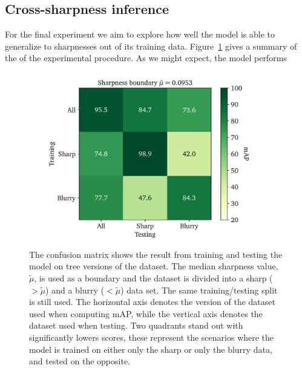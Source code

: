 \subsection{Cross-sharpness inference}
For the final experiment we aim to explore how well the model is able to generalize to sharpnesses out of its training data.
Figure~\ref{fig:results-sharpness-inference} gives a summary of the of the experimental procedure.
As we might expect, the model performs 

\begin{figure}[htbp]
  \centering
  \includegraphics[width=0.9\textwidth]{figs/results/sharpness/confustion_balanced_test_map.pdf}
  \caption[mAP across sharpness boundary]{%
The confusion matrix shows the result from training and testing the model on tree versions of the dataset. 
The median sharpness value, \(\tilde{\mu}\), is used as a boundary and the dataset is divided into a sharp (\(>\tilde{\mu}\)) and a blurry (\(<\tilde{\mu}\)) data set.
The same training/testing split is still used. 
The horizontal axis denotes the version of the dataset used when computing mAP, while the vertical axis denotes the dataset used when testing.
Two quadrants stand out with significantly lowers scores,  these represent the scenarios where the model is trained on either only the sharp or only the blurry data, and tested on the opposite.
  }\label{fig:results-sharpness-inference}
\end{figure}

